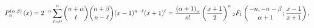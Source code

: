 \[P^{(\alpha,\beta)}_{n}\left(x\right)=2^{-n}\sum_{\ell=0}^{n}\genfrac{(}{)}{0.0%
pt}{}{n+\alpha}{\ell}\genfrac{(}{)}{0.0pt}{}{n+\beta}{n-\ell}(x-1)^{n-\ell}(x+%
1)^{\ell}=\frac{{\left(\alpha+1\right)_{n}}}{n!}\left(\frac{x+1}{2}\right)^{n}%
{{}_{2}F_{1}}\left({-n,-n-\beta\atop\alpha+1};\frac{x-1}{x+1}\right),\]